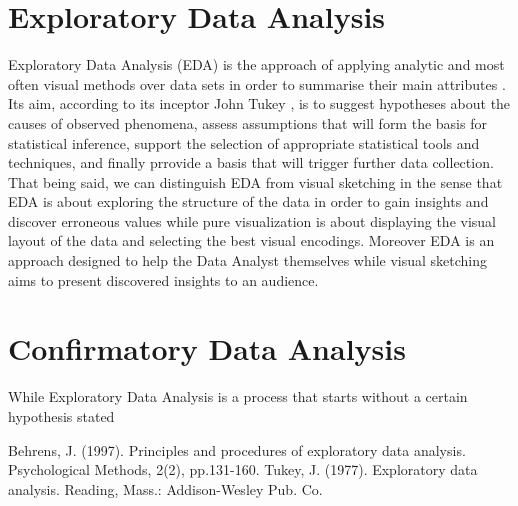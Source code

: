 \documentclass[16pt]{extreport}
\begin{document}
\section{Exploratory Data Analysis}
\large{Exploratory Data Analysis (EDA) is the approach of applying analytic and most often visual methods over data sets in order to summarise their main attributes \cite{eda1}. Its aim, according to its inceptor John Tukey \cite{eda2}, is to suggest hypotheses about the causes of observed phenomena, assess assumptions that will form the basis for statistical inference, support the selection of appropriate statistical tools and techniques, and finally prrovide a basis that will trigger further data collection. \\ That being said, we can distinguish EDA from visual sketching in the sense that EDA is about exploring the structure of the data in order to gain insights and discover erroneous values while pure visualization is about displaying the visual layout of the data and selecting the best visual encodings. Moreover EDA is an approach designed to help the Data Analyst themselves while visual sketching aims to present discovered insights to an audience.}

\section{Confirmatory Data Analysis} 
\large{While Exploratory Data Analysis is a process that starts without a certain hypothesis stated  }

\begin{thebibliography}{99}
Behrens, J. (1997). Principles and procedures of exploratory data analysis. Psychological Methods, 2(2), pp.131-160.
Tukey, J. (1977). Exploratory data analysis. Reading, Mass.: Addison-Wesley Pub. Co.
\end{thebibliography}
\end{document}
